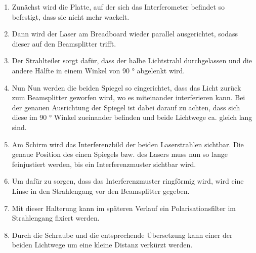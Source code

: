 \documentclass[12pt,english,ngerman]{scrartcl}
\begin{document}
\begin{enumerate}
    \item Zunächst wird die Platte, auf der sich das Interferometer befindet so befestigt, dass sie nicht mehr wackelt.
    \item Dann wird der Laser am Breadboard wieder parallel ausgerichtet, sodass dieser auf den Beamsplitter trifft.
    \item Der Strahlteiler sorgt dafür, dass der halbe Lichtstrahl durchgelassen und die andere Hälfte in einem Winkel
    von 90 ° abgelenkt wird.
    \item Nun Nun werden die beiden Spiegel so eingerichtet, dass das Licht zurück zum Beamsplitter geworfen wird, wo es 
    miteinander interferieren kann. Bei der genauen Ausrichtung der Spiegel ist dabei darauf zu achten, dass sich diese 
    im 90 ° Winkel zueinander befinden und beide Lichtwege ca. gleich lang sind.
    \item Am Schirm wird das Interferenzbild der beiden Laserstrahlen sichtbar. Die genaue Position des einen Spiegels 
    bzw. des Lasers muss nun so lange feinjustiert werden, bis ein Interferenzmuster sichtbar wird.
    \item Um dafür zu sorgen, dass das Interferenzmuster ringförmig wird, wird eine Linse in den Strahlengang vor den 
    Beamsplitter gegeben.
    \item Mit dieser Halterung kann im späteren Verlauf ein Polarisationsfilter im Strahlengang fixiert werden.
    \item Durch die Schraube und die entsprechende Übersetzung kann einer der beiden Lichtwege um eine kleine Distanz 
    verkürzt werden.
\end{enumerate}
\end{document}
